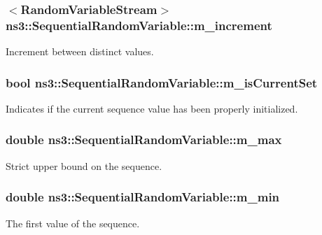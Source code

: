 \subsubsection[{\texorpdfstring{m\+\_\+increment}{m_increment}}]{$<${\bf Random\+Variable\+Stream}$>$ ns3\+::\+Sequential\+Random\+Variable\+::m\+\_\+increment\hspace{0.3cm}{\ttfamily [private]}}\hypertarget{classns3_1_1SequentialRandomVariable_abb30c71cae8727ea8c2330f0dc309e6f}{}\label{classns3_1_1SequentialRandomVariable_abb30c71cae8727ea8c2330f0dc309e6f}
Increment between distinct values. 
\subsubsection[{\texorpdfstring{m\+\_\+is\+Current\+Set}{m_isCurrentSet}}]{\setlength{\rightskip}{0pt plus 5cm}bool ns3\+::\+Sequential\+Random\+Variable\+::m\+\_\+is\+Current\+Set\hspace{0.3cm}{\ttfamily [private]}}\hypertarget{classns3_1_1SequentialRandomVariable_afa73acac6f4f810d2ff71e794a5a0c2d}{}\label{classns3_1_1SequentialRandomVariable_afa73acac6f4f810d2ff71e794a5a0c2d}
Indicates if the current sequence value has been properly initialized. 
\subsubsection[{\texorpdfstring{m\+\_\+max}{m_max}}]{\setlength{\rightskip}{0pt plus 5cm}double ns3\+::\+Sequential\+Random\+Variable\+::m\+\_\+max\hspace{0.3cm}{\ttfamily [private]}}\hypertarget{classns3_1_1SequentialRandomVariable_ab3ab59c289b5ee0751562c5e46020def}{}\label{classns3_1_1SequentialRandomVariable_ab3ab59c289b5ee0751562c5e46020def}
Strict upper bound on the sequence. 
\subsubsection[{\texorpdfstring{m\+\_\+min}{m_min}}]{\setlength{\rightskip}{0pt plus 5cm}double ns3\+::\+Sequential\+Random\+Variable\+::m\+\_\+min\hspace{0.3cm}{\ttfamily [private]}}\hypertarget{classns3_1_1SequentialRandomVariable_a168c620d4730301c20caab6abcbd00dc}{}\label{classns3_1_1SequentialRandomVariable_a168c620d4730301c20caab6abcbd00dc}
The first value of the sequence. 

